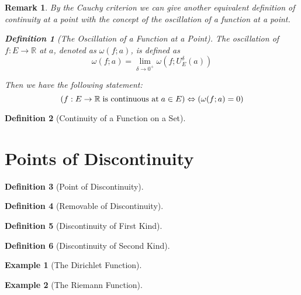 \documentclass[onecolumn]{ctexart}
\newtheorem{definition}{Definition}
\newtheorem{remark}{Remark}
\newtheorem{example}{Example}
\begin{document}
\begin{remark}
  By the Cauchy criterion we can give another equivalent definition of 
  continuity at a point with the concept of the oscillation of a function at a 
  point.
  \begin{definition}[The Oscillation of a Function at a Point]
    The oscillation of $f:E \to \mathbb{R}$ at $a$, denoted as $\omega(f;a)$, is defined as
    \begin{equation}
      \omega(f;a) = \lim_{\delta \to 0^+} \omega(f;U_E^\delta(a))
    \end{equation}
  \end{definition}
  Then we have the following statement:
  \[
    (f:E \to \mathbb{R} \thickspace \textnormal{is continuous at} \thickspace a \in E) \Leftrightarrow
    (\omega(f;a) = 0)
  \]
\end{remark}

\begin{definition}[Continuity of a Function on a Set]
  
\end{definition}

\section{Points of Discontinuity}

\begin{definition}[Point of Discontinuity]
  
\end{definition}

\begin{definition}[Removable of Discontinuity]
  
\end{definition}

\begin{definition}[Discontinuity of First Kind]
  
\end{definition}

\begin{definition}[Discontinuity of Second Kind]
  
\end{definition}

\begin{example}[The Dirichlet Function]
  
\end{example}

\begin{example}[The Riemann Function]
  
\end{example}
\end{document}
